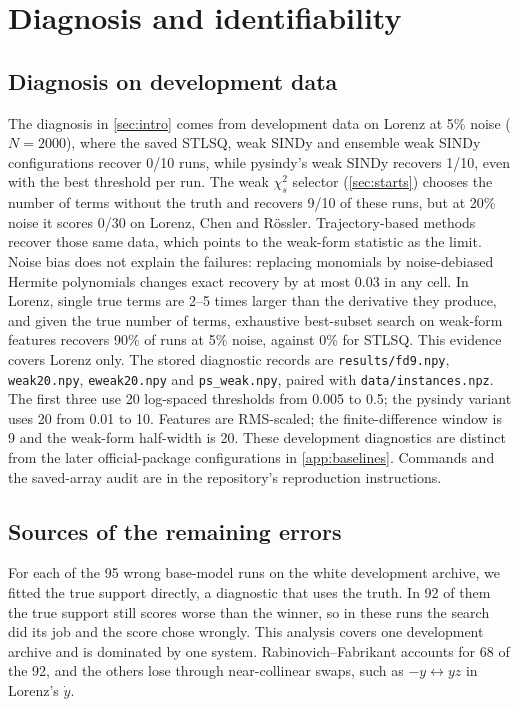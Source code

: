\section{Diagnosis and identifiability}
\subsection{Diagnosis on development data}
\label{sec:diagnosis}
The diagnosis in \cref{sec:intro} comes from development data on Lorenz at 5\% noise ($N=2000$), where the saved STLSQ, weak SINDy and ensemble weak SINDy configurations recover 0/10 runs, while pysindy's weak SINDy recovers 1/10, even with the best threshold per run. The weak $\chi^2_s$ selector (\cref{sec:starts}) chooses the number of terms without the truth and recovers 9/10 of these runs, but at 20\% noise it scores 0/30 on Lorenz, Chen and R\"ossler. Trajectory-based methods recover those same data, which points to the weak-form statistic as the limit. Noise bias does not explain the failures: replacing monomials by noise-debiased Hermite polynomials changes exact recovery by at most 0.03 in any cell. In Lorenz, single true terms are 2--5 times larger than the derivative they produce, and given the true number of terms, exhaustive best-subset search on weak-form features recovers 90\% of runs at 5\% noise, against 0\% for STLSQ. This evidence covers Lorenz only. The stored diagnostic records are \texttt{results/fd9.npy}, \texttt{weak20.npy}, \texttt{eweak20.npy} and \texttt{ps\_weak.npy}, paired with \texttt{data/instances.npz}. The first three use 20 log-spaced thresholds from 0.005 to 0.5; the pysindy variant uses 20 from 0.01 to 10. Features are RMS-scaled; the finite-difference window is 9 and the weak-form half-width is 20. These development diagnostics are distinct from the later official-package configurations in \cref{app:baselines}. Commands and the saved-array audit are in the repository's reproduction instructions.

\subsection{Sources of the remaining errors}
\label{sec:identifiability}
For each of the 95 wrong base-model runs on the white development archive, we fitted the true support directly, a diagnostic that uses the truth. In 92 of them the true support still scores worse than the winner, so in these runs the search did its job and the score chose wrongly. This analysis covers one development archive and is dominated by one system. Rabinovich--Fabrikant accounts for 68 of the 92, and the others lose through near-collinear swaps, such as $-y\leftrightarrow yz$ in Lorenz's $\dot y$.


